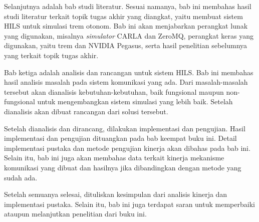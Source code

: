 Selanjutnya adalah bab studi literatur. Sesuai namanya, bab ini membahas hasil
studi literatur terkait topik tugas akhir yang diangkat, yaitu membuat sistem
HILS untuk simulasi trem otonom. Bab ini akan menjabarkan perangkat lunak yang
digunakan, misalnya \textit{simulator} CARLA dan ZeroMQ, perangkat keras yang
digunakan, yaitu trem dan NVIDIA Pegasus, serta hasil penelitian sebelumnya yang
terkait topik tugas akhir.

Bab ketiga adalah analisis dan rancangan untuk sistem HILS. Bab ini membahas
hasil analisis masalah pada sistem komunikasi yang ada. Dari masalah-masalah
tersebut akan dianalisis kebutuhan-kebutuhan, baik fungsional maupun
non-fungsional untuk mengembangkan sistem simulasi yang lebih baik. Setelah
dianalisis akan dibuat rancangan dari solusi tersebut.

Setelah dianalisis dan dirancang, dilakukan implementasi dan pengujian. Hasil
implementasi dan pengujian dituangkan pada bab keempat buku ini. Detail
implementasi pustaka dan metode pengujian kinerja akan dibahas pada bab ini.
Selain itu, bab ini juga akan membahas data terkait kinerja mekanisme komunikasi
yang dibuat dan hasilnya jika dibandingkan dengan metode yang sudah ada.

Setelah semuanya selesai, dituliskan kesimpulan dari analisis kinerja dan
implementasi pustaka. Selain itu, bab ini juga terdapat saran untuk memperbaiki
ataupun melanjutkan penelitian dari buku ini.
